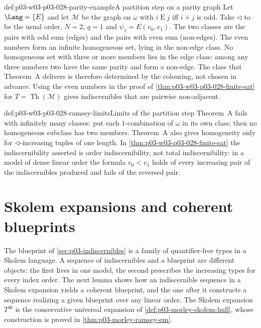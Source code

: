 \begin{hbexample}{def:p03-w03-p03-028-parity-example}{A partition step on a parity graph}
Let \(\Lang=\{E\}\) and let \(\mathcal M\) be the graph on \(\omega\) with
\(i\mathrel E j\) iff \(i+j\) is odd.  Take \(\lhd\) to be the usual order,
\(N=2\), \(q=1\) and \(\psi_1=E(v_0,v_1)\).  The two classes are the pairs
with odd sum (edges) and the pairs with even sum (non-edges).  The even
numbers form an infinite homogeneous set, lying in the non-edge class.  No
homogeneous set with three or more members lies in the edge class: among any
three numbers two have the same parity and form a non-edge.  The class that
Theorem~A delivers is therefore determined by the colouring, not chosen in
advance.  Using the even numbers in the proof of
\cref{thm:p03-w03-p03-028-finite-sat} for \(T=\operatorname{Th}(\mathcal
M)\) gives indiscernibles that are pairwise non-adjacent.
\end{hbexample}

\begin{hbwarning}{def:p03-w03-p03-028-ramsey-limits}{Limits of the partition step}
Theorem~A fails with infinitely many classes: put each \(1\)-combination of
\(\omega\) in its own class; then no homogeneous subclass has two members.
Theorem~A also gives homogeneity only for \(\lhd\)-increasing tuples of one
length.  In \cref{thm:p03-w03-p03-028-finite-sat} the indiscernibility
asserted is order indiscernibility, not total indiscernibility: in a model
of dense linear order the formula \(v_0<v_1\) holds of every increasing
pair of the indiscernibles produced and fails of the reversed pair.
\end{hbwarning}

\section{Skolem expansions and coherent blueprints}
\label{sec:p03-w03-p03-028-blueprints}

The blueprint of \cref{sec:p03-indiscernibles} is a family of quantifier-free
types in a Skolem language.  A sequence of indiscernibles and a blueprint
are different objects: the first lives in one model, the second prescribes
the increasing types for every index order.  The next lemma shows how an
indiscernible sequence in a Skolem expansion yields a coherent blueprint,
and the one after it constructs a sequence realizing a given blueprint over
any linear order.  The Skolem expansion \(T^{\mathrm{sk}}\) is the
conservative universal expansion of \cref{def:p03-morley-skolem-hull},
whose construction is proved in \cref{thm:p03-morley-ramsey-em}.

